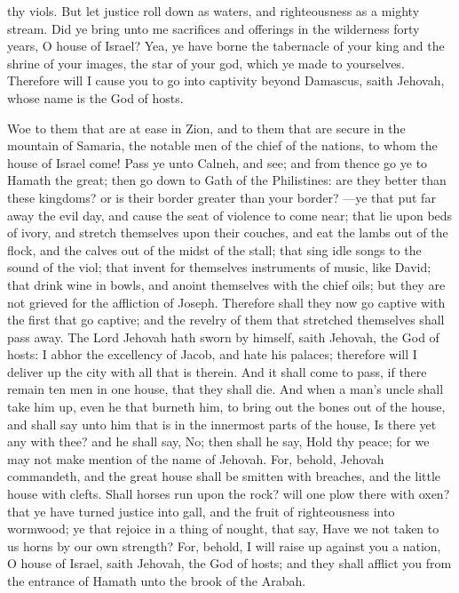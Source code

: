 thy viols. But let justice roll down as waters, and righteousness as a mighty stream.  Did ye bring unto me sacrifices and offerings in the wilderness forty years, O house of Israel? Yea, ye have borne the tabernacle of your king and the shrine of your images, the star of your god, which ye made to yourselves. Therefore will I cause you to go into captivity beyond Damascus, saith Jehovah, whose name is the God of hosts. 

Woe to them that are at ease in Zion, and to them that are secure in the mountain of Samaria, the notable men of the chief of the nations, to whom the house of Israel come! Pass ye unto Calneh, and see; and from thence go ye to Hamath the great; then go down to Gath of the Philistines: are they better than these kingdoms? or is their border greater than your border? —ye that put far away the evil day, and cause the seat of violence to come near; that lie upon beds of ivory, and stretch themselves upon their couches, and eat the lambs out of the flock, and the calves out of the midst of the stall; that sing idle songs to the sound of the viol; that invent for themselves instruments of music, like David; that drink wine in bowls, and anoint themselves with the chief oils; but they are not grieved for the affliction of Joseph.  Therefore shall they now go captive with the first that go captive; and the revelry of them that stretched themselves shall pass away. The Lord Jehovah hath sworn by himself, saith Jehovah, the God of hosts: I abhor the excellency of Jacob, and hate his palaces; therefore will I deliver up the city with all that is therein. And it shall come to pass, if there remain ten men in one house, that they shall die. And when a man’s uncle shall take him up, even he that burneth him, to bring out the bones out of the house, and shall say unto him that is in the innermost parts of the house, Is there yet any with thee? and he shall say, No; then shall he say, Hold thy peace; for we may not make mention of the name of Jehovah. For, behold, Jehovah commandeth, and the great house shall be smitten with breaches, and the little house with clefts.  Shall horses run upon the rock? will one plow there with oxen? that ye have turned justice into gall, and the fruit of righteousness into wormwood; ye that rejoice in a thing of nought, that say, Have we not taken to us horns by our own strength? For, behold, I will raise up against you a nation, O house of Israel, saith Jehovah, the God of hosts; and they shall afflict you from the entrance of Hamath unto the brook of the Arabah. 

